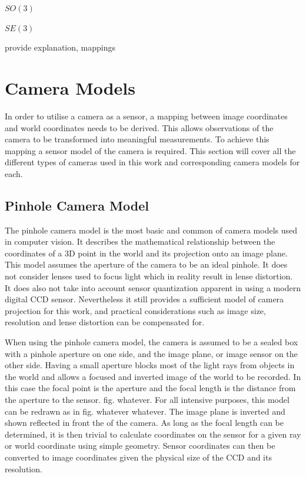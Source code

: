 $SO(3)$

$SE(3)$

provide explanation, mappings

\section{Camera Models}

In order to utilise a camera as a sensor, a mapping between image coordinates and world coordinates needs to be derived.  This allows observations of the camera to be transformed into meaningful measurements.  To achieve this mapping a sensor model of the camera is required. This section will cover all the different types of cameras used in this work and corresponding camera models for each. 

\subsection{Pinhole Camera Model}
\label{subsec:pinhole_cam}


The pinhole camera model is the most basic and common of camera models used in computer vision.  It describes the mathematical relationship between the coordinates of a 3D point in the world and its projection onto an image plane.  This model assumes the aperture of the camera to be an ideal pinhole. It does not consider lenses used to focus light which in reality result in lense distortion.  It does also not take into account sensor quantization apparent in using a modern digital CCD sensor. Nevertheless it still provides a sufficient model of camera projection for this work, and practical considerations such as image size, resolution and lense distortion can be compensated for.

When using the pinhole camera model, the camera is assumed to be a sealed box with a pinhole aperture on one side, and the image plane, or image sensor on the other side.  Having a small aperture blocks most of the light rays from objects in the world and allows a focused and inverted image of the world to be recorded. In this case the focal point is the aperture and the focal length is the distance from the aperture to the sensor. fig. whatever. For all intensive purposes, this model can be redrawn as in fig. whatever whatever. The image plane is inverted and shown reflected in front the of the camera.  As long as the focal length can be determined, it is then trivial to calculate coordinates on the sensor for a given ray or world coordinate using simple geometry. Sensor coordinates can then be converted to image coordinates given the physical size of the CCD and its resolution.  

